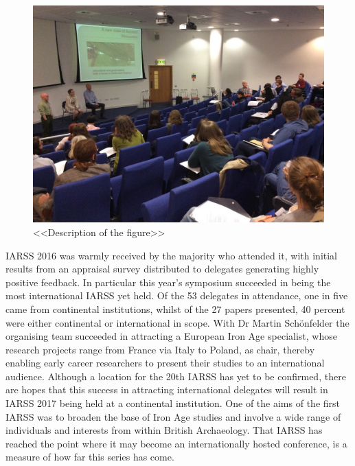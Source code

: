\documentclass[ngerman,english]{ijsra}
\begin{document}
\begin{figure}
\includegraphics[width=\linewidth]{figures/IARSS_Conference3}
\caption{<<Description of the figure>>}
\label{fig:IARSS_Conference3}
\end{figure} 
IARSS 2016 was warmly received by the majority who attended it, with initial results from an appraisal survey distributed to delegates generating highly positive feedback. In particular this year’s symposium succeeded in being the most international IARSS yet held. 
Of the 53 delegates in attendance, one in five came from continental institutions, whilst of the 27 papers presented, 40 percent were either continental or international in scope. With Dr Martin Schönfelder the organising team succeeded in attracting a European Iron Age specialist, whose research projects range from France via Italy to Poland, as chair, thereby enabling early career researchers to present their studies to an international audience. Although a location for the 20th IARSS has yet to be confirmed, there are hopes that this success in attracting international delegates will result in IARSS 2017 being held at a continental institution. One of the aims of the first IARSS was to broaden the base of Iron Age studies and involve a wide range of individuals and interests from within British Archaeology. 
That IARSS has reached the point where it may become an internationally hosted conference, is a measure of how far this series has come.
\end{document}
